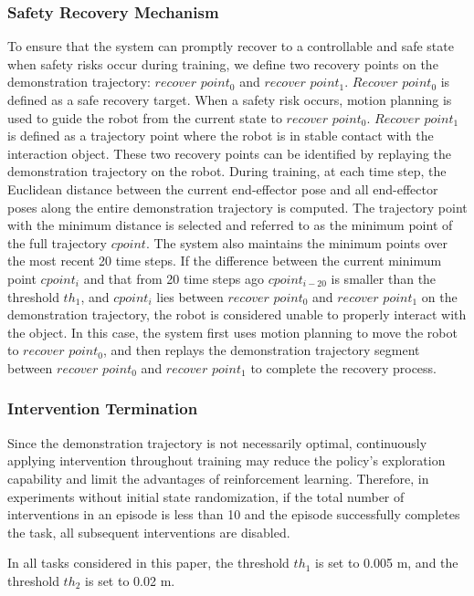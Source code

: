 \documentclass[runningheads]{llncs}
\begin{document}
\subsubsection{Safety Recovery Mechanism}\label{sec:recovery}
To ensure that the system can promptly recover to a controllable and safe state when safety risks occur during training, we define two recovery points on the demonstration trajectory: $recover$ $point_0$ and $recover$ $point_1$. $Recover$ $point_0$ is defined as a safe recovery target. When a safety risk occurs, motion planning is used to guide the robot from the current state to $recover$ $point_0$. $Recover$ $point_1$ is defined as a trajectory point where the robot is in stable contact with the interaction object. These two recovery points can be identified by replaying the demonstration trajectory on the robot.
During training, at each time step, the Euclidean distance between the current end-effector pose and all end-effector poses along the entire demonstration trajectory is computed. The trajectory point with the minimum distance is selected and referred to as the minimum point of the full trajectory $cpoint$. The system also maintains the minimum points over the most recent 20 time steps. If the difference between the current minimum point $cpoint_i$ and that from 20 time steps ago $cpoint_{i-20}$ is smaller than the threshold $th_1$, and $cpoint_i$ lies between $recover$ $point_0$ and $recover$ $point_1$ on the demonstration trajectory, the robot is considered unable to properly interact with the object.
In this case, the system first uses motion planning to move the robot to $recover$ $point_0$, and then replays the demonstration trajectory segment between $recover$ $point_0$ and $recover$ $point_1$ to complete the recovery process.

\subsubsection{Intervention Termination} Since the demonstration trajectory is not necessarily optimal, continuously applying intervention throughout training may reduce the policy’s exploration capability and limit the advantages of reinforcement learning. Therefore, in experiments without initial state randomization, if the total number of interventions in an episode is less than 10 and the episode successfully completes the task, all subsequent interventions are disabled.

In all tasks considered in this paper, the threshold $th_1$ is set to 0.005 m, and the threshold $th_2$ is set to 0.02 m.
\end{document}
